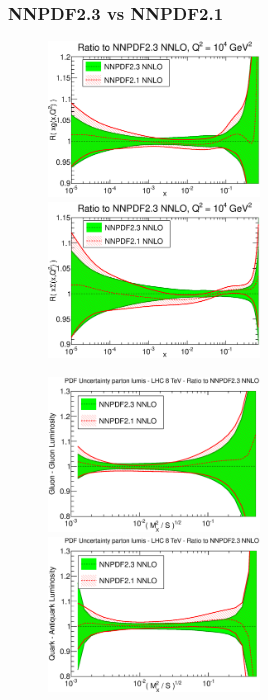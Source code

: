 \documentclass[10pt]{beamer}
\begin{document}
\begin{frame}
\frametitle{NNPDF2.3 vs NNPDF2.1}
 \begin{figure}[b!]
    \begin{center}
      \includegraphics[width=0.50\textwidth]{xg_Q_10000_log-rat-21-vs-23-nnlo}
      \includegraphics[width=0.50\textwidth]{xSinglet_Q_10000_log-rat-21-vs-23-nnlo}
    \end{center}
    \vskip-0.5cm
    \label{fig:pdf-jets}
\end{figure}

 \begin{figure}[b!]
    \begin{center}
      \includegraphics[width=0.50\textwidth]{gg_S_6_4e+07-rat-8tev}
      \includegraphics[width=0.50\textwidth]{qq_S_6_4e+07-rat-8tev}
    \end{center}
    \vskip-0.5cm
    \label{fig:pdf-jets}
\end{figure}

\vskip15pt

\end{frame}
\end{document}
